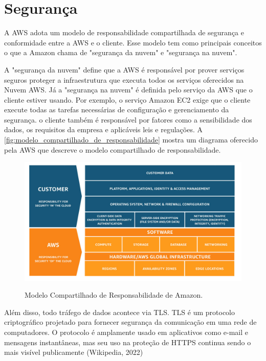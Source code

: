 \section{Segurança}\label{section:aws_iot_security}

A AWS adota um modelo de responsabilidade compartilhada de segurança e conformidade entre a AWS e o cliente. Esse modelo tem como principais conceitos o que a Amazon chama de "segurança da nuvem" e "segurança na nuvem".

A "segurança da nuvem" define que a AWS é responsável por prover serviços seguros proteger a infraestrutura que executa todos os serviços oferecidos na Nuvem AWS. Já a "segurança na nuvem" é definida pelo serviço da AWS que o cliente estiver usando. Por exemplo, o serviço Amazon EC2 exige que o cliente execute todas as tarefas necessárias de configuração e gerenciamento da segurança. o cliente também é responsável por fatores como a sensibilidade dos dados, os requisitos da empresa e aplicáveis leis e regulações. A \autoref{fig:modelo_compartilhado_de_responsabilidade} mostra um diagrama oferecido pela AWS que descreve o modelo compartilhado de responsabilidade.

\begin{figure}[htbp]
	\centering
	\caption{Modelo Compartilhado de Responsabilidade de Amazon.}
	\includegraphics[scale=0.35]{Imagens/modelo_compartilhado_de_responsabilidade.jpg}
	\label{fig:modelo_compartilhado_de_responsabilidade}
\end{figure}

Além disso, todo tráfego de dados acontece via TLS. TLS é um protocolo criptográfico projetado para fornecer segurança da comunicação em uma rede de computadores. O protocolo é amplamente usado em aplicativos como e-mail e mensagens instantâneas, mas seu uso na proteção de HTTPS continua sendo o mais visível publicamente (Wikipedia, 2022)

